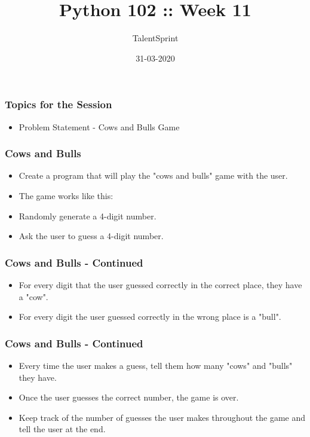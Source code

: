 \documentclass[14pt]{beamer}
\title{Python 102 :: Week 11}
\date{31-03-2020}
\author[TS]{TalentSprint}
\begin{document}
    \begin{frame}
        \titlepage
    \end{frame}
    \begin{frame}
        \frametitle{Topics for the Session}
        \begin{itemize}
            \item Problem Statement - Cows and Bulls Game
        \end{itemize}
    \end{frame}

    \begin{frame}[containsverbatim]
        \frametitle{Cows and Bulls}
        \begin{itemize}
		\item Create a program that will play the "cows and bulls" game with the user. 
		\item The game works like this:
		\item Randomly generate a 4-digit number.
		\item Ask the user to guess a 4-digit number. 
        \end{itemize}
    \end{frame}

    \begin{frame}[containsverbatim]
        \frametitle{Cows and Bulls - Continued}
        \begin{itemize}
		\item For every digit that the user guessed correctly in the correct place, they have a "cow". 
		\item For every digit the user guessed correctly in the wrong place is a "bull". 
        \end{itemize}
    \end{frame}

    \begin{frame}[containsverbatim]
        \frametitle{Cows and Bulls - Continued}
        \begin{itemize}
		\item Every time the user makes a guess, tell them how many "cows" and "bulls" they have.
		\item Once the user guesses the correct number, the game is over. 
		\item Keep track of the number of guesses the user makes throughout the game and tell the user at the end.
        \end{itemize}
    \end{frame}
\end{document}
